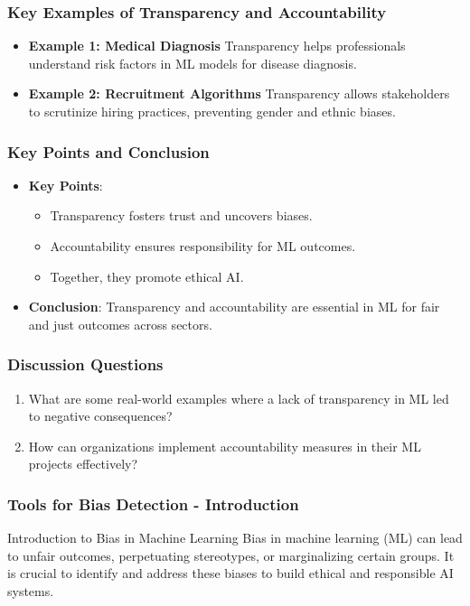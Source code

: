 \documentclass[aspectratio=169]{beamer}
\begin{document}
\begin{frame}[fragile]
    \frametitle{Key Examples of Transparency and Accountability}
    \begin{itemize}
        \item \textbf{Example 1: Medical Diagnosis}  
        Transparency helps professionals understand risk factors in ML models for disease diagnosis.
        
        \item \textbf{Example 2: Recruitment Algorithms}  
        Transparency allows stakeholders to scrutinize hiring practices, preventing gender and ethnic biases.
    \end{itemize}
\end{frame}

\begin{frame}[fragile]
    \frametitle{Key Points and Conclusion}
    \begin{itemize}
        \item \textbf{Key Points}:
        \begin{itemize}
            \item Transparency fosters trust and uncovers biases.
            \item Accountability ensures responsibility for ML outcomes.
            \item Together, they promote ethical AI.
        \end{itemize}
        \item \textbf{Conclusion}: Transparency and accountability are essential in ML for fair and just outcomes across sectors.
    \end{itemize}
\end{frame}

\begin{frame}[fragile]
    \frametitle{Discussion Questions}
    \begin{enumerate}
        \item What are some real-world examples where a lack of transparency in ML led to negative consequences?
        \item How can organizations implement accountability measures in their ML projects effectively?
    \end{enumerate}
\end{frame}

\begin{frame}[fragile]
    \frametitle{Tools for Bias Detection - Introduction}
    \begin{block}{Introduction to Bias in Machine Learning}
        Bias in machine learning (ML) can lead to unfair outcomes, perpetuating stereotypes, or marginalizing certain groups. It is crucial to identify and address these biases to build ethical and responsible AI systems.
    \end{block}
\end{frame}
\end{document}
